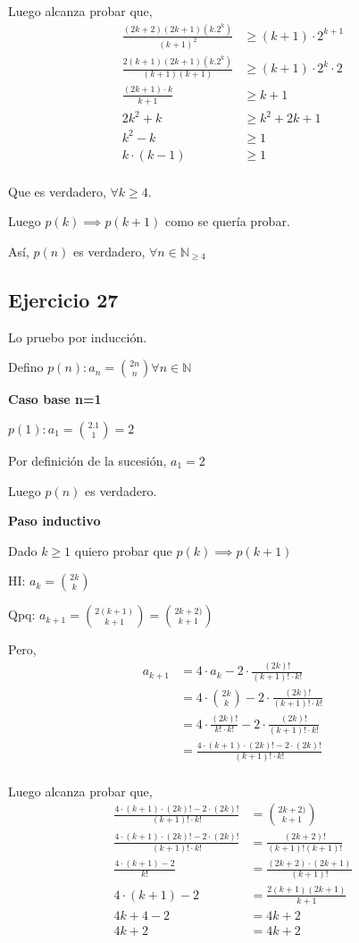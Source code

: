 Luego alcanza probar que,
\begin{align*}
    \frac{(2k+2)(2k+1)(k.2^k)}{(k+1)^2} &\geq (k+1)\cdot 2^{k+1} \\
    \frac{2(k+1)(2k+1)(k.2^k)}{(k+1)(k+1)} &\geq (k+1)\cdot 2^{k} \cdot 2 \\
    \frac{(2k+1)\cdot k}{k+1} &\geq k+1 \\
    2k^2 + k &\geq k^2 + 2k +1 \\
    k^2 - k &\geq 1 \\
    k \cdot (k-1) &\geq 1 \\
\end{align*}

Que es verdadero, $ \forall k \geq 4 $.

Luego $ p(k) \implies p(k+1) $ como se quería probar.

Así, $ p(n) $ es verdadero, $\forall n \in \mathbb{N}_{\geq 4} $

\subsection{Ejercicio 27}
Lo pruebo por inducción.

Defino $ p(n): a_n = \binom{2n}{n} \forall n \in \mathbb{N} $

\textbf{Caso base n=1}

$ p(1): a_1 = \binom{2.1}{1} = 2$

Por definición de la sucesión, $ a_1 = 2 $

Luego $ p(n) $ es verdadero.

\textbf{Paso inductivo}

Dado $ k \geq 1 $ quiero probar que $ p(k) \implies p(k+1) $

HI: $ a_k = \binom{2k}{k} $

Qpq: $a_{k+1} = \binom{2(k+1)}{k+1} = \binom{2k+2)}{k+1} $

Pero,
\begin{align*}
    a_{k+1} &= 4 \cdot a_k - 2 \cdot \frac{(2k)!}{(k+1)! \cdot k!} \\
    &= 4 \cdot \binom{2k}{k} - 2 \cdot \frac{(2k)!}{(k+1)! \cdot k!} \\
    &= 4 \cdot \frac{(2k)!}{k! \cdot k!} - 2 \cdot \frac{(2k)!}{(k+1)! \cdot k!} \\
    &= \frac{4\cdot (k+1)\cdot (2k)! - 2 \cdot (2k)!}{(k+1)! \cdot k!} \\
\end{align*}

Luego alcanza probar que,
\begin{align*}
    \frac{4\cdot (k+1)\cdot (2k)! - 2 \cdot (2k)!}{(k+1)! \cdot k!} &= \binom{2k+2)}{k+1} \\
    \frac{4\cdot (k+1)\cdot (2k)! - 2 \cdot (2k)!}{(k+1)! \cdot k!} &= \frac{(2k+2)!}{(k+1)!(k+1)!} \\
    \frac{4\cdot (k+1) - 2}{k!} &= \frac{(2k+2) \cdot (2k+1)}{(k+1)!} \\
    4\cdot (k+1) - 2 &= \frac{2(k+1)(2k+1)}{k+1} \\
    4k + 4 - 2 &= 4k + 2 \\
    4k + 2 &= 4k + 2 \\
\end{align*}

